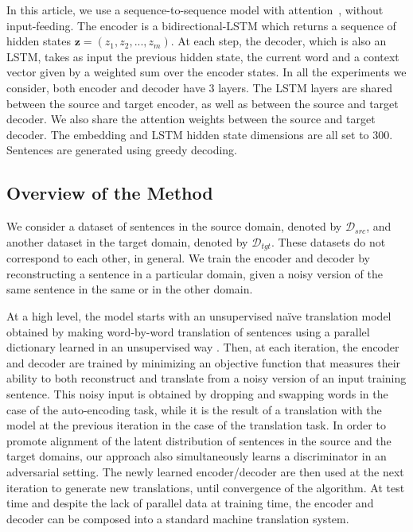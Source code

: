 In this article, we use a sequence-to-sequence model with attention~\citep{attentionNMT}, without input-feeding. The encoder is a bidirectional-LSTM which returns a sequence of hidden states $\bm{z} = (z_1, z_2, ..., z_m)$. At each step, the decoder, which is also an LSTM, takes as input the previous hidden state, the current word and a context vector given by a weighted sum over the encoder states. In all the experiments we consider, both encoder and decoder have 3 layers. The LSTM layers are shared between the source and target encoder, as well as between the source and target decoder. We also share the attention weights between the source and target decoder. The embedding and LSTM hidden state dimensions are all set to 300. Sentences are generated using greedy decoding.



\subsection{Overview of the Method}

We consider a dataset of sentences in the source domain, denoted by $\mathcal{D}_{src}$, and another dataset in the target domain, denoted by $\mathcal{D}_{tgt}$. These datasets do not  correspond to each other, in general. We train the encoder and decoder by reconstructing a sentence in a particular domain, given a noisy version of the same sentence in the same or in the other domain. 

At a high level, the model starts with an unsupervised na\"ive translation model obtained by making word-by-word translation of sentences using a parallel dictionary learned in an unsupervised way \citep{wordalign17}. Then, at each iteration, the encoder and decoder are trained by minimizing an objective function that measures their ability 
to both reconstruct and translate from a noisy version of an input training sentence. This noisy input is obtained by dropping and swapping words in the case of the auto-encoding task, while it is the result of a translation with the model at the previous iteration in the case of the translation task. In order to promote alignment of the latent distribution of sentences in the source and the target domains, our approach also simultaneously learns a discriminator in an adversarial setting. The newly learned encoder/decoder are then used at the next iteration to generate new translations, until convergence of the algorithm. At test time and despite the lack of parallel data at training time, the encoder and decoder can be composed into a standard machine translation system. 

